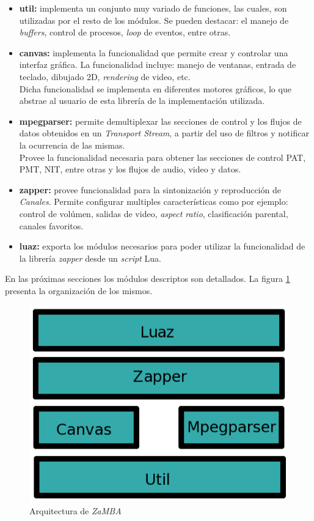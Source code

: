 \begin{itemize}
\item \textbf{util:}
implementa un conjunto muy variado de funciones, las cuales, son utilizadas por el resto de los módulos. 
Se pueden destacar: el manejo de \textit{buffers}, control de procesos, \textit{loop} de eventos, entre otras.

\item \textbf{canvas:}
implementa la funcionalidad que permite crear y controlar una interfaz gráfica. La funcionalidad incluye: manejo 
de ventanas, entrada de teclado, dibujado 2D, \textit{rendering} de video, etc. \\Dicha funcionalidad se implementa en diferentes
motores gráficos, lo que abstrae al usuario de esta librería de la implementación utilizada.

\item \textbf{mpegparser:}
permite demultiplexar las secciones de control y los flujos de datos obtenidos en un \textit{Transport Stream}, a partir del uso de filtros y notificar la ocurrencia de las mismas.\\
Provee la funcionalidad necesaria para obtener las secciones de control PAT, PMT, NIT, entre otras y los flujos de audio, video y datos.  

\item \textbf{zapper:}
provee funcionalidad para la sintonización y reproducción de \emph{Canales}. Permite configurar multiples características como por ejemplo: control de volúmen, salidas de video,
\textit{aspect ratio}, clasificación parental, canales favoritos.

\item \textbf{luaz:}
exporta los módulos necesarios para poder utilizar la funcionalidad de la librería \emph{zapper} desde un \textit{script} Lua.
\end{itemize}

En las próximas secciones los módulos descriptos son detallados. La figura \ref{zamba:modules} presenta la organización de los mismos.

\begin{figure}[ht!]
\centering
\includegraphics[scale=0.50]{../resources/zamba-modules}
\caption{Arquitectura de \emph{ZaMBA}}
\label{zamba:modules}
\end{figure}

